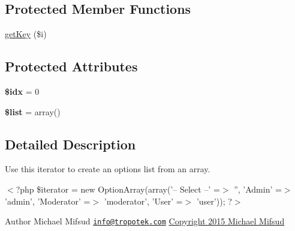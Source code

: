 \subsection*{Protected Member Functions}
\begin{DoxyCompactItemize}
\item 
\hyperlink{classTk_1_1Form_1_1Field_1_1Option_1_1ArrayIterator_a73d7e5b6561e4d1905cf39bea3e398e0}{get\+Key} (\$i)
\end{DoxyCompactItemize}
\subsection*{Protected Attributes}
\begin{DoxyCompactItemize}
\item 
\hypertarget{classTk_1_1Form_1_1Field_1_1Option_1_1ArrayIterator_affcca538b814f074ae9b520899195299}{{\bfseries \$idx} = 0}\label{classTk_1_1Form_1_1Field_1_1Option_1_1ArrayIterator_affcca538b814f074ae9b520899195299}

\item 
\hypertarget{classTk_1_1Form_1_1Field_1_1Option_1_1ArrayIterator_ad028c6af8d8e66b75fa6a14312b45c49}{{\bfseries \$list} = array()}\label{classTk_1_1Form_1_1Field_1_1Option_1_1ArrayIterator_ad028c6af8d8e66b75fa6a14312b45c49}

\end{DoxyCompactItemize}


\subsection{Detailed Description}
Use this iterator to create an options list from an array.

$<$?php \$iterator = new Option\+Array(array('-- Select --' =$>$ '', 'Admin' =$>$ 'admin', 'Moderator' =$>$ 'moderator', 'User' =$>$ 'user')); ?$>$

\begin{DoxyAuthor}{Author}
Michael Mifsud \href{mailto:info@tropotek.com}{\tt info@tropotek.\+com} \hyperlink{}{Copyright 2015 Michael Mifsud }
\end{DoxyAuthor}


